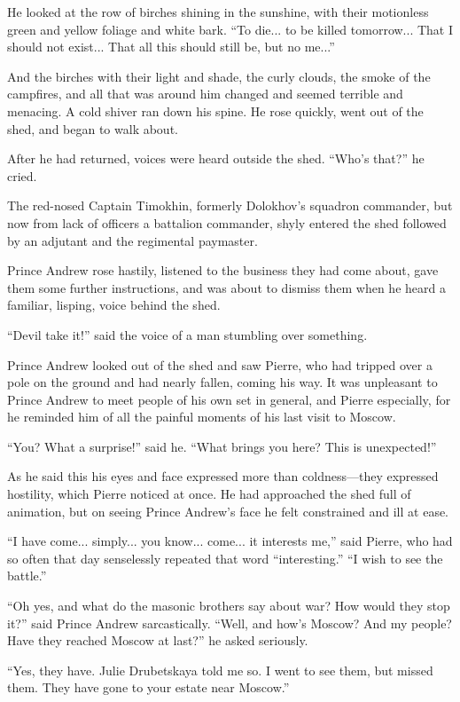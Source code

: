 He looked at the row of birches shining in the sunshine, with
their motionless green and yellow foliage and white bark. ``To
die... to be killed tomorrow... That I should not exist... That
all this should still be, but no me...''

And the birches with their light and shade, the curly clouds, the
smoke of the campfires, and all that was around him changed and
seemed terrible and menacing. A cold shiver ran down his
spine. He rose quickly, went out of the shed, and began to walk
about.

After he had returned, voices were heard outside the
shed. ``Who's that?''  he cried.

The red-nosed Captain Timokhin, formerly Dolokhov's squadron
commander, but now from lack of officers a battalion commander,
shyly entered the shed followed by an adjutant and the regimental
paymaster.

Prince Andrew rose hastily, listened to the business they had
come about, gave them some further instructions, and was about to
dismiss them when he heard a familiar, lisping, voice behind the
shed.

``Devil take it!'' said the voice of a man stumbling over
something.

Prince Andrew looked out of the shed and saw Pierre, who had
tripped over a pole on the ground and had nearly fallen, coming
his way. It was unpleasant to Prince Andrew to meet people of his
own set in general, and Pierre especially, for he reminded him of
all the painful moments of his last visit to Moscow.

``You? What a surprise!'' said he. ``What brings you here? This
is unexpected!''

As he said this his eyes and face expressed more than
coldness---they expressed hostility, which Pierre noticed at
once. He had approached the shed full of animation, but on seeing
Prince Andrew's face he felt constrained and ill at ease.

``I have come... simply... you know... come... it interests me,''
said Pierre, who had so often that day senselessly repeated that
word ``interesting.'' ``I wish to see the battle.''

``Oh yes, and what do the masonic brothers say about war? How
would they stop it?'' said Prince Andrew sarcastically. ``Well,
and how's Moscow? And my people? Have they reached Moscow at
last?'' he asked seriously.

``Yes, they have. Julie Drubetskaya told me so. I went to see
them, but missed them. They have gone to your estate near
Moscow.''


